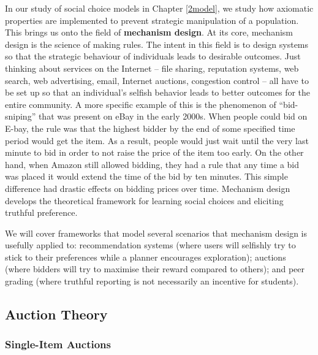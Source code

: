 \documentclass[
  letterpaper,
  numbers=noenddot,
  DIV=11,
  oneside]{scrreprt}
\theoremstyle{remark}
\begin{document}
In our study of social choice models in Chapter
\hyperref[2human-decision-making-choice-models]{{[}2model{]}}, we study
how axiomatic properties are implemented to prevent strategic
manipulation of a population. This brings us onto the field of
\textbf{mechanism design}. At its core, mechanism design is the science
of making rules. The intent in this field is to design systems so that
the strategic behaviour of individuals leads to desirable outcomes. Just
thinking about services on the Internet -- file sharing, reputation
systems, web search, web advertising, email, Internet auctions,
congestion control -- all have to be set up so that an individual's
selfish behavior leads to better outcomes for the entire community. A
more specific example of this is the phenomenon of ``bid-sniping'' that
was present on eBay in the early 2000s. When people could bid on E-bay,
the rule was that the highest bidder by the end of some specified time
period would get the item. As a result, people would just wait until the
very last minute to bid in order to not raise the price of the item too
early. On the other hand, when Amazon still allowed bidding, they had a
rule that any time a bid was placed it would extend the time of the bid
by ten minutes. This simple difference had drastic effects on bidding
prices over time. Mechanism design develops the theoretical framework
for learning social choices and eliciting truthful preference.

We will cover frameworks that model several scenarios that mechanism
design is usefully applied to: recommendation systems (where users will
selfishly try to stick to their preferences while a planner encourages
exploration); auctions (where bidders will try to maximise their reward
compared to others); and peer grading (where truthful reporting is not
necessarily an incentive for students).

\subsection{Auction Theory}\label{auction-theory}

\subsubsection*{Single-Item Auctions}\label{single-item-auctions}
\end{document}
